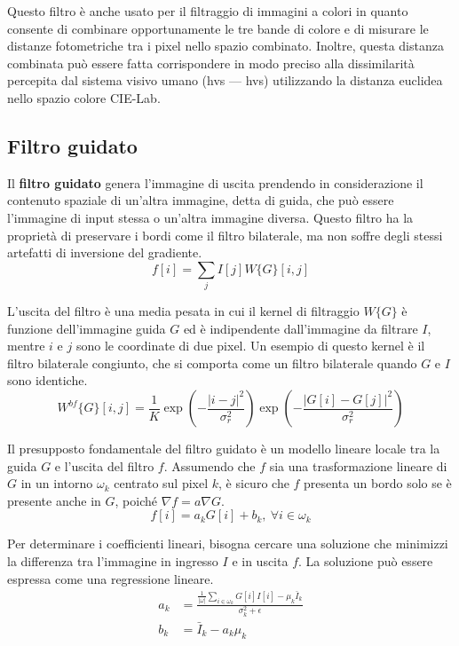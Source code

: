 \documentclass[../main.tex]{subfiles}
\begin{document}
Questo filtro è anche usato per il filtraggio di immagini a colori in quanto consente di combinare opportunamente le tre bande di colore e di misurare le distanze fotometriche tra i pixel nello spazio combinato. Inoltre, questa distanza combinata può essere fatta corrispondere in modo preciso alla dissimilarità percepita dal sistema visivo umano (\acrlong{hvs} --- \acrshort{hvs}) utilizzando la distanza euclidea nello spazio colore CIE-Lab.\cite{wyszecki_2000}

\subsection{Filtro guidato}

Il \textbf{filtro guidato} genera l'immagine di uscita prendendo in considerazione il contenuto spaziale di un'altra immagine, detta di guida, che può essere l'immagine di input stessa o un'altra immagine diversa. Questo filtro ha la proprietà di preservare i bordi come il filtro bilaterale, ma non soffre degli stessi artefatti di inversione del gradiente\cite{durand_2002}.
\begin{equation}
	f[i] = \sum_{j}I[j]W\{G\}[i,j]
\end{equation}

L'uscita del filtro è una media pesata in cui il kernel di filtraggio $W\{G\}$ è funzione dell'immagine guida $G$ ed è indipendente dall'immagine da filtrare $I$, mentre $i$ e $j$ sono le coordinate di due pixel. Un esempio di questo kernel è il filtro bilaterale congiunto, che si comporta come un filtro bilaterale quando $G$ e $I$ sono identiche.\cite{petschnigg_2004}
\begin{equation}
	W^{bf}\{G\}[i,j] = \frac{1}{K} \exp\left(-\frac{|i-j|^2}{\sigma^2_r}\right) \exp\left(-\frac{|G[i]-G[j]|^2}{\sigma_r^2}\right)
\end{equation} 

Il presupposto fondamentale del filtro guidato è un modello lineare locale tra la guida $G$ e l'uscita del filtro $f$. Assumendo che $f$ sia una trasformazione lineare di $G$ in un intorno $\omega_k$ centrato sul pixel $k$, è sicuro che $f$ presenta un bordo solo se è presente anche in $G$, poiché $\nabla f = a\nabla G$\cite{he_2013}.
\begin{equation}
	f[i] = a_kG[i]+b_k,\ \forall i\in\omega_k
\end{equation}

Per determinare i coefficienti lineari, bisogna cercare una soluzione che minimizzi la differenza tra l'immagine in ingresso $I$ e in uscita $f$. La soluzione può essere espressa come una regressione lineare.
\begin{align}
	a_k &= \frac{\frac{1}{|\omega|}\sum_{i\in\omega_k}G[i]I[i]-\mu_k\bar{I}_k}{\sigma_k^2+\epsilon}\\
	b_k &= \bar{I}_k-a_k\mu_k
\end{align}
\end{document}
